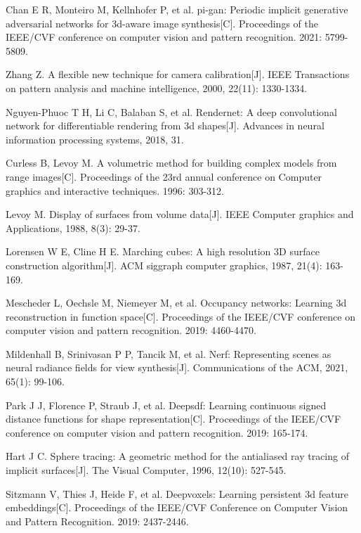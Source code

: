 Chan E R, Monteiro M, Kellnhofer P, et al. pi-gan: Periodic implicit generative adversarial networks for 3d-aware image synthesis[C]. Proceedings of the IEEE/CVF conference on computer vision and pattern recognition. 2021: 5799-5809.


Zhang Z. A flexible new technique for camera calibration[J]. IEEE Transactions on pattern analysis and machine intelligence, 2000, 22(11): 1330-1334.

Nguyen-Phuoc T H, Li C, Balaban S, et al. Rendernet: A deep convolutional network for differentiable rendering from 3d shapes[J]. Advances in neural information processing systems, 2018, 31.

Curless B, Levoy M. A volumetric method for building complex models from range images[C]. Proceedings of the 23rd annual conference on Computer graphics and interactive techniques. 1996: 303-312.

Levoy M. Display of surfaces from volume data[J]. IEEE Computer graphics and Applications, 1988, 8(3): 29-37.

Lorensen W E, Cline H E. Marching cubes: A high resolution 3D surface construction algorithm[J]. ACM siggraph computer graphics, 1987, 21(4): 163-169.


Mescheder L, Oechsle M, Niemeyer M, et al. Occupancy networks: Learning 3d reconstruction in function space[C]. Proceedings of the IEEE/CVF conference on computer vision and pattern recognition. 2019: 4460-4470.

Mildenhall B, Srinivasan P P, Tancik M, et al. Nerf: Representing scenes as neural radiance fields for view synthesis[J]. Communications of the ACM, 2021, 65(1): 99-106.

Park J J, Florence P, Straub J, et al. Deepsdf: Learning continuous signed distance functions for shape representation[C]. Proceedings of the IEEE/CVF conference on computer vision and pattern recognition. 2019: 165-174.

Hart J C. Sphere tracing: A geometric method for the antialiased ray tracing of implicit surfaces[J]. The Visual Computer, 1996, 12(10): 527-545.

Sitzmann V, Thies J, Heide F, et al. Deepvoxels: Learning persistent 3d feature embeddings[C]. Proceedings of the IEEE/CVF Conference on Computer Vision and Pattern Recognition. 2019: 2437-2446.

